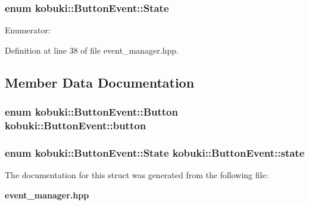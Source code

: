 \subsubsection[{\-State}]{\setlength{\rightskip}{0pt plus 5cm}enum {\bf kobuki\-::\-Button\-Event\-::\-State}}\label{structkobuki_1_1ButtonEvent_ad74db533b4ed915d35dcb4dcc3aa424d}
\begin{Desc}
\item[\-Enumerator\-: ]\par
\begin{description}
\item[{\em 
\-Released\label{structkobuki_1_1ButtonEvent_ad74db533b4ed915d35dcb4dcc3aa424da9a45540769414c9ecc57b2e01d3d955c}
}]\item[{\em 
\-Pressed\label{structkobuki_1_1ButtonEvent_ad74db533b4ed915d35dcb4dcc3aa424da028a011233cc9802321d6e1d05824a16}
}]\end{description}
\end{Desc}



\-Definition at line 38 of file event\-\_\-manager.\-hpp.



\subsection{\-Member \-Data \-Documentation}
\subsubsection[{button}]{\setlength{\rightskip}{0pt plus 5cm}enum {\bf kobuki\-::\-Button\-Event\-::\-Button}  {\bf kobuki\-::\-Button\-Event\-::button}}\label{structkobuki_1_1ButtonEvent_aac4f1a9cc793c2ab00da5aaa33ee1dde}
\subsubsection[{state}]{\setlength{\rightskip}{0pt plus 5cm}enum {\bf kobuki\-::\-Button\-Event\-::\-State}  {\bf kobuki\-::\-Button\-Event\-::state}}\label{structkobuki_1_1ButtonEvent_a2f8795d1acf50424c79c05c5637b84db}


\-The documentation for this struct was generated from the following file\-:\begin{DoxyCompactItemize}
\item 
{\bf event\-\_\-manager.\-hpp}\end{DoxyCompactItemize}
